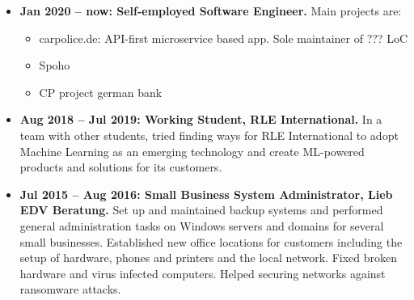 \documentclass[10pt]{article}
\begin{document}
\begin{itemize}[label={}, leftmargin=*]

\item \textbf{Jan 2020 -- now: Self-employed Software Engineer.} Main
  projects are:

  \begin{itemize}[label=\bullet]
    \item carpolice.de: API-first microservice based app. Sole maintainer of
      ??? LoC

    \item Spoho

    \item CP project german bank
  \end{itemize}

\item \textbf{Aug 2018 -- Jul 2019: Working Student, RLE International.}
In a team with other students, tried finding ways for RLE
International to adopt Machine Learning as an emerging technology and
create ML-powered products and solutions for its customers.

\item \textbf{Jul 2015 -- Aug 2016: Small Business System Administrator,
Lieb EDV Beratung.}
Set up and maintained backup systems and performed general
administration tasks on Windows servers and domains for several small
businesses.
Established new office locations for customers including the setup of
hardware, phones and printers and the local network.
Fixed broken hardware and virus infected computers.
Helped securing networks against ransomware attacks.

\end{itemize}

%
\end{document}
